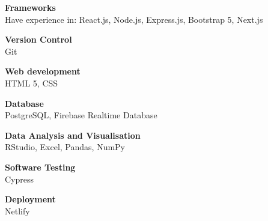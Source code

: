 \documentclass[letterpaper,11pt]{article}
\begin{document}
    \vspace{0.5em}
    \textbf{Frameworks}
    \\
    Have experience in: React.js, Node.js, Express.js, Bootstrap 5, Next.js

    \vspace{0.5em}
    \textbf{Version Control}
    \\
    Git

    \vspace{0.5em}
    \textbf{Web development}
    \\
    HTML 5, CSS

    \vspace{0.5em}
    \textbf{Database}
    \\
    PostgreSQL, Firebase Realtime Database

    \vspace{0.5em}
    \textbf{Data Analysis and Visualisation}
    \\
    RStudio, Excel, Pandas, NumPy 

    \vspace{0.5em}
    \textbf{Software Testing}
    \\
    Cypress

    \vspace{0.5em}
    \textbf{Deployment}
    \\
    Netlify
\end{document}

